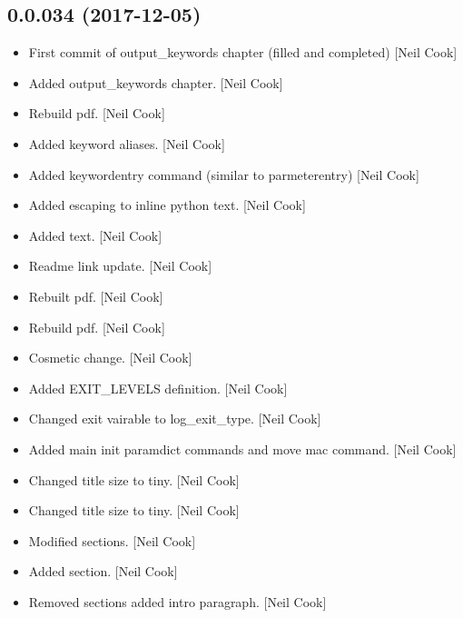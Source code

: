 \documentclass[a4paper,10pt,english]{report}
\begin{document}
\subsection{0.0.034 (2017-12-05)}
\label{\detokenize{misc/changelog:id516}}\begin{itemize}
\item {} 
First commit of output\_keywords chapter (filled and completed) {[}Neil
Cook{]}

\item {} 
Added output\_keywords chapter. {[}Neil Cook{]}

\item {} 
Rebuild pdf. {[}Neil Cook{]}

\item {} 
Added keyword aliases. {[}Neil Cook{]}

\item {} 
Added keywordentry command (similar to parmeterentry) {[}Neil Cook{]}

\item {} 
Added escaping to inline python text. {[}Neil Cook{]}

\item {} 
Added text. {[}Neil Cook{]}

\item {} 
Readme link update. {[}Neil Cook{]}

\item {} 
Rebuilt pdf. {[}Neil Cook{]}

\item {} 
Rebuild pdf. {[}Neil Cook{]}

\item {} 
Cosmetic change. {[}Neil Cook{]}

\item {} 
Added EXIT\_LEVELS definition. {[}Neil Cook{]}

\item {} 
Changed exit vairable to log\_exit\_type. {[}Neil Cook{]}

\item {} 
Added main init paramdict commands and move mac command. {[}Neil Cook{]}

\item {} 
Changed title size to tiny. {[}Neil Cook{]}

\item {} 
Changed title size to tiny. {[}Neil Cook{]}

\item {} 
Modified sections. {[}Neil Cook{]}

\item {} 
Added section. {[}Neil Cook{]}

\item {} 
Removed sections added intro paragraph. {[}Neil Cook{]}

\end{itemize}
\end{document}
